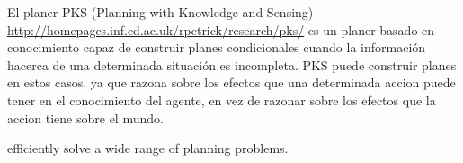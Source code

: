 



El planer PKS (Planning with Knowledge and Sensing) \url{http://homepages.inf.ed.ac.uk/rpetrick/research/pks/}
es un planer basado en conocimiento capaz de construir planes
condicionales cuando la informaci\'on hacerca de una determinada
situaci\'on es incompleta.  PKS puede construir planes en
estos casos, ya que razona sobre los efectos que una determinada
accion puede tener en el conocimiento del agente, en vez de
razonar sobre los efectos que la accion tiene sobre el mundo.

efficiently solve a wide range of planning problems.
